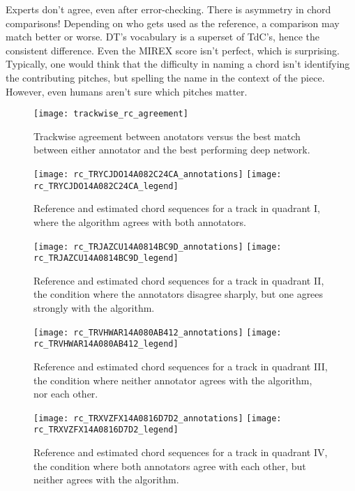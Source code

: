 Experts don't agree, even after error-checking.
There is asymmetry in chord comparisons!
Depending on who gets used as the reference, a comparison may match better or worse.
DT's vocabulary is a superset of TdC's, hence the consistent difference.
Even the MIREX score isn't perfect, which is surprising.
Typically, one would think that the difficulty in naming a chord isn't identifying the contributing pitches, but spelling the name in the context of the piece.
However, even humans aren't sure which pitches matter.


\begin{figure}[t]
\centering
\texttt{[image: trackwise\_rc\_agreement]}
\caption{Trackwise agreement between anotators versus the best match between either annotator and the best performing deep network.}
\label{fig:trackwise_test_agreement}
\end{figure}


\begin{figure}[t]
\centering
\texttt{[image: rc\_TRYCJDO14A082C24CA\_annotations]}
\texttt{[image: rc\_TRYCJDO14A082C24CA\_legend]}
\caption{Reference and estimated chord sequences for a track in quadrant I, where the algorithm agrees with both annotators.}
\label{fig:rc_quadI}
\end{figure}

\begin{figure}[t]
\centering
\texttt{[image: rc\_TRJAZCU14A0814BC9D\_annotations]}
\texttt{[image: rc\_TRJAZCU14A0814BC9D\_legend]}
\caption{Reference and estimated chord sequences for a track in quadrant II, the condition where the annotators disagree sharply, but one agrees strongly with the algorithm.}
\label{fig:rc_quadII}
\end{figure}

\begin{figure}[t]
\centering
\texttt{[image: rc\_TRVHWAR14A080AB412\_annotations]}
\texttt{[image: rc\_TRVHWAR14A080AB412\_legend]}
\caption{Reference and estimated chord sequences for a track in quadrant III, the condition where neither annotator agrees with the algorithm, nor each other.}
\label{fig:rc_quadIII}
\end{figure}

\begin{figure}[t]
\centering
\texttt{[image: rc\_TRXVZFX14A0816D7D2\_annotations]}
\texttt{[image: rc\_TRXVZFX14A0816D7D2\_legend]}
\caption{Reference and estimated chord sequences for a track in quadrant IV, the condition where both annotators agree with each other, but neither agrees with the algorithm.}
\label{fig:rc_quadIV}
\end{figure}





